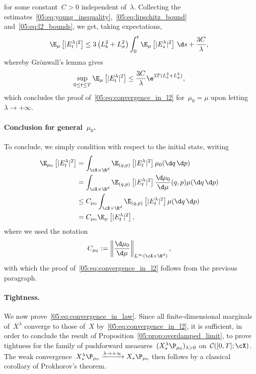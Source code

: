 for some constant~$C>0$ independent of~$\lambda$. Collecting the estimates~\eqref{05:eq:young_inequality},~\eqref{05:eq:lipschitz_bound} and~\eqref{05:eq:l2_bounds}, we get, taking expectations,
\begin{equation}
    \E_\mu\left[|E_t^\lambda|^2\right] \leq 3\left(L_b^2+L_\sigma^2\right)\int_0^t\E_\mu\left[|E_s^\lambda|^2\right]\,\d s + \frac{3C}{\lambda},
\end{equation}
whereby Gr\"onwall's lemma gives
\begin{equation}
    \underset{0\leq t\leq T}{\sup}\,\E_\mu\left[|E_t^\lambda|^2\right] \leq \frac{3C}{\lambda}\e^{3T(L_b^2+L_\sigma^2)},
\end{equation}
which concludes the proof of~\eqref{05:eq:convergence_in_l2} for~$\mu_0=\mu$ upon letting~$\lambda\to +\infty$.
\paragraph{Conclusion for general~$\mu_0$.}
To conclude, we simply condition with respect to the initial state, writing
\begin{equation}
    \label{05:eq:conditioning_argument}
    \begin{aligned}
    \E_{\mu_0}\left[|E_t^\lambda|^2\right] &= \int_{\cX\times\R^d} \E_{(q,p)}\left[|E_t^\lambda|^2\right]\mu_0(\d q\,\d p)\\
    &= \int_{\cX\times\R^d} \E_{(q,p)}\left[|E_t^\lambda|^2\right]\frac{\d\mu_0}{\d \mu}(q,p)\mu(\d q\,\d p)\\
    &\leq C_{\mu_0}\int_{\cX\times\R^d}\E_{(q,p)}\left[|E_t^\lambda|^2\right]\mu(\d q\,\d p)\\
    &=C_{\mu_0}\E_{\mu}\left[|E_t^\lambda|^2\right],
    \end{aligned}
\end{equation}
where we used the notation
\begin{equation}
    C_{\mu_0} :=\left\|\frac{\d\mu_0}{\d\mu}\right\|_{L^\infty(\cX\times\R^d)},
\end{equation}
with which the proof of~\eqref{05:eq:convergence_in_l2} follows from the previous paragraph.

\paragraph{Tightness.}
We now prove~\eqref{05:eq:convergence_in_law}.
Since all finite-dimensional marginals of~$X^\lambda$ converge to those of~$X$ by~\eqref{05:eq:convergence_in_l2}, it is sufficient, in order to conclude the result of Proposition~\ref{05:prop:overdamped_limit}, to prove tightness for the family of pushforward measures~$(X^\lambda_* \P_{\mu_0})_{\lambda>0}$ on~$\mathcal C([0,T];\cX)$.
The weak convergence~$X^\lambda_*\P_{\mu_0}\xrightarrow{\lambda\to+\infty} X_*\P_{\mu_0}$ then follows by a classical corollary of Prokhorov's theorem.

